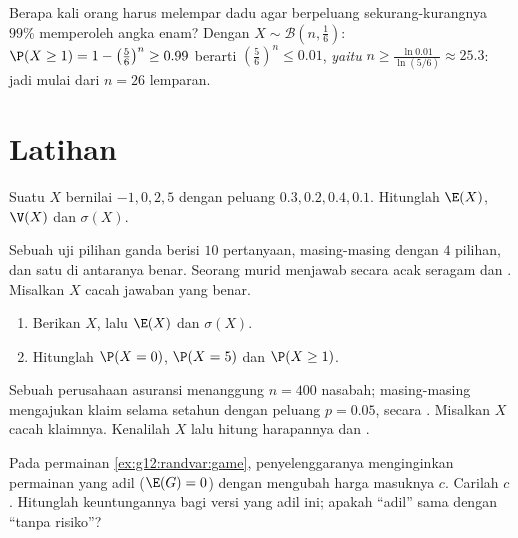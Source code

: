 \begin{example}\label{ex:g12:randvar:atleastone}
Berapa kali orang harus melempar dadu agar berpeluang sekurang-kurangnya $99\%$
memperoleh angka enam? Dengan $X \sim \mathcal B\left(n, \frac16\right)$:
$\P(X \geq 1) = 1 - \left(\frac56\right)^n \geq 0.99$ berarti
$\left(\frac56\right)^n \leq 0.01$, \emph{yaitu}
$n \geq \frac{\ln 0.01}{\ln(5/6)} \approx 25.3$: jadi mulai dari $n = 26$ lemparan.
\end{example}

\section{Latihan}

\begin{exercise}[$\star$]\label{exo:g12:randvar:1}
Suatu  $X$ bernilai $-1, 0, 2, 5$ dengan peluang
$0.3, 0.2, 0.4, 0.1$. Hitunglah $\E(X)$, $\V(X)$ dan $\sigma(X)$.
\end{exercise}

\begin{exercise}[$\star$]\label{exo:g12:randvar:2}
Sebuah uji pilihan ganda berisi $10$ pertanyaan, masing-masing dengan $4$ pilihan, dan satu
di antaranya benar. Seorang murid menjawab secara acak seragam dan .
Misalkan $X$ cacah jawaban yang benar.
\begin{enumerate}
  \item Berikan  $X$, lalu $\E(X)$ dan $\sigma(X)$.
  \item Hitunglah $\P(X = 0)$, $\P(X = 5)$ dan $\P(X \geq 1)$.
\end{enumerate}
\end{exercise}

\begin{exercise}[$\star$]\label{exo:g12:randvar:3}
Sebuah perusahaan asuransi menanggung $n = 400$ nasabah; masing-masing mengajukan klaim selama
setahun dengan peluang $p = 0.05$, secara . Misalkan $X$ cacah
klaimnya. Kenalilah  $X$ lalu hitung harapannya dan
.
\end{exercise}

\begin{exercise}[$\star\star$]\label{exo:g12:randvar:4}
Pada permainan \cref{ex:g12:randvar:game}, penyelenggaranya menginginkan permainan yang adil
($\E(G) = 0$) dengan mengubah harga masuknya $c$. Carilah $c$. Hitunglah
 keuntungannya bagi versi yang adil ini; apakah ``adil'' sama dengan
``tanpa risiko''?
\end{exercise}

